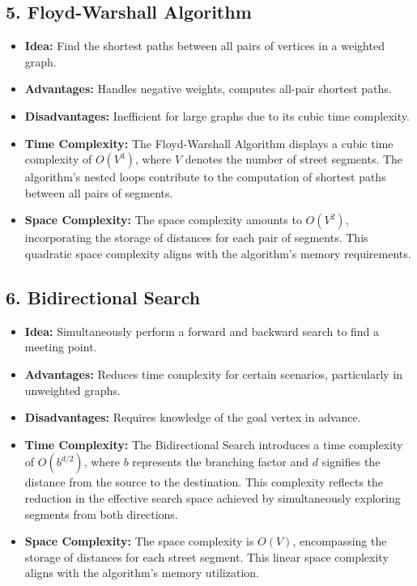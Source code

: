 \documentclass[a4paper, 12pt]{article}
\begin{document}
	\subsection*{5. Floyd-Warshall Algorithm}
	\begin{itemize}
		\item \textbf{Idea:} Find the shortest paths between all pairs of vertices in a weighted graph.
		\item \textbf{Advantages:} Handles negative weights, computes all-pair shortest paths.
		\item \textbf{Disadvantages:} Inefficient for large graphs due to its cubic time complexity.
		 \item \textbf{Time Complexity:} The Floyd-Warshall Algorithm displays a cubic time complexity of $O(V^3)$, where $V$ denotes the number of street segments. The algorithm's nested loops contribute to the computation of shortest paths between all pairs of segments.
		\item \textbf{Space Complexity:} The space complexity amounts to $O(V^2)$, incorporating the storage of distances for each pair of segments. This quadratic space complexity aligns with the algorithm's memory requirements.
		
		
	\end{itemize}
	
	\subsection*{6. Bidirectional Search}
	\begin{itemize}
		\item \textbf{Idea:} Simultaneously perform a forward and backward search to find a meeting point.
		\item \textbf{Advantages:} Reduces time complexity for certain scenarios, particularly in unweighted graphs.
		\item \textbf{Disadvantages:} Requires knowledge of the goal vertex in advance.
		\item \textbf{Time Complexity:} The Bidirectional Search introduces a time complexity of $O(b^{d/2})$, where $b$ represents the branching factor and $d$ signifies the distance from the source to the destination. This complexity reflects the reduction in the effective search space achieved by simultaneously exploring segments from both directions.
		\item \textbf{Space Complexity:} The space complexity is $O(V)$, encompassing the storage of distances for each street segment. This linear space complexity aligns with the algorithm's memory utilization.
		
	\end{itemize}
	
\end{document}
